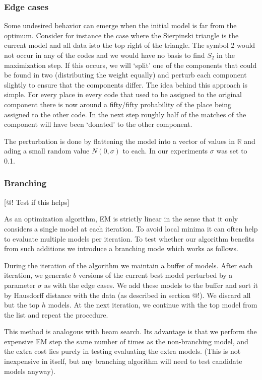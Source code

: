 \documentclass[11pt]{article}
\theoremstyle{definition}
\begin{document}
\subsubsection{Edge cases}

Some undesired behavior can emerge when the initial model is far from the optimum. Consider for instance the case where the Sierpinski triangle is the current model and all data isto the top right of the triangle. The symbol 2 would not occur in any of the codes and we would have no basis to find $S_2$ in the maximization step. If this occurs, we will `split' one of the components that could be found in two (distributing the weight equally) and perturb each component slightly to ensure that the components differ. The idea behind this approach is simple. For every place in every code that used to be assigned to the original component there is now around a fifty/fifty probability of the place being assigned to the other code. In the next step roughly half of the matches of the component will have been `donated' to the other component.

The perturbation is done by flattening the model into a vector of values in ${\mathbb R}$ and ading a small random value $N(0, \sigma)$ to each. In our experiments $\sigma$ was set to 0.1.

\subsubsection{Branching}

[@! Test if this helps]

As an optimization algorithm, EM is strictly linear in the sense that it only considers a single model at each iteration. To avoid local minima it can often help to evaluate multiple models per iteration. To test whether our algorithm benefits from such additions we introduce a branching mode which works as follows.

During the iteration of the algorithm we maintain a buffer of models. After each iteration, we generate $b$ versions of the current best model perturbed by a parameter $\sigma$ as with the edge cases. We add these models to the buffer and sort it by Hausdorff distance with the data (as described in section @!). We discard all but the top $h$ models. At the next iteration, we continue with the top model from the list and repeat the procedure.

This method is analogous with beam search. Its advantage is that we perform the expensive EM step the same number of times as the non-branching model, and the extra cost lies purely in testing evaluating the extra models. (This is not inexpensive in itself, but any branching algorithm will need to test candidate models anyway).
\end{document}
